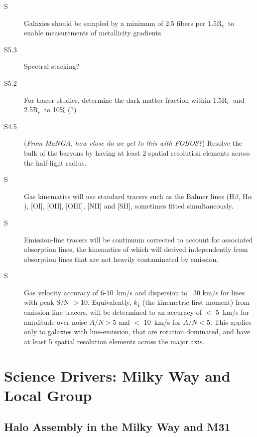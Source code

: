 \documentclass[preprint,11pt]{aastex}
\newcommand{\Halpha}{{H$\alpha$}}
\newcommand{\Hbeta}{{H$\beta$}}
\newcommand{\Reff}{{R$_{e}$}}
\begin{document}
\begin{description}
\item[S] Galaxies should be sampled by a minimum of 2.5 fibers per 1.5\Reff\
 to enable measurements of metallicity gradients 

\item[S5.3] Spectral stacking?

\item[S5.2] For tracer studies, determine the dark matter fraction within 1.5\Reff\ and 2.5\Reff\ to 10\% (?)


\item [S4.5] (\emph{From MaNGA, how close do we get to this with FOBOS?}) Resolve the bulk of the baryons by having at least 2
  spatial resolution elements across the half-light radius.

\item[S]  Gas kinematics will use standard tracers such as the Balmer
  lines (\Hbeta, \Halpha), [OI], [OII], [OIII], [NII] and [SII],
  sometimes fitted simultaneously. 

\item[S]  Emission-line tracers will be continuum corrected to account for
  associated absorption lines, the kinematics of which will derived
  independently from absorption lines that are not heavily contaminated
  by emission.

\item[S] Gas velocity accuracy of 6-10~km/s and dispersion to
  ~30 km/s for lines with peak S/N $>$10.  Equivalently, $k_1$ (the
  kinemetric first moment) from emission-line tracers, will be
  determined to an accuracy of $<$ 5~km/s for amplitude-over-noise
  $A/N>5$ and $<$ 10~km/s for $A/N<5$. This applies only to galaxies
  with line-emission, that are rotation dominated, and have at least 5
  spatial resolution elements across the major axis.


\end{description}




\newpage
\section{Science Drivers: Milky Way and Local Group} \label{sci:localgroup}

\subsection{Halo Assembly in the Milky Way and M31}
\end{document}
